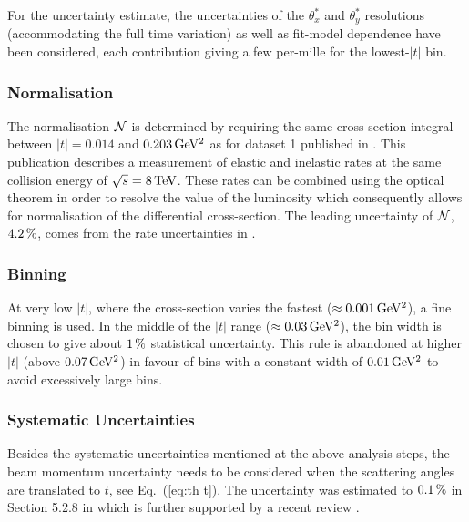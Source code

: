 For the uncertainty estimate, the uncertainties of the $\theta_x^*$ and $\theta_y^*$ resolutions (accommodating the full time variation) as well as fit-model dependence have been considered, each contribution giving a few per-mille for the lowest-$|t|$ bin.


\subsubsection{Normalisation}
\label{sec:normalisation}

The normalisation ${\cal N}$ is determined by requiring the same cross-section integral between $|t| = 0.014$ and $0.203\,{\rm GeV^2}$ as for dataset 1 published in \cite{prl111}. This publication describes a measurement of elastic and inelastic rates at the same collision energy of $\sqrt s = 8\,{\rm TeV}$. These rates can be combined using the optical theorem in order to resolve the value of the luminosity which consequently allows for normalisation of the differential cross-section. The leading uncertainty of ${\cal N}$, $4.2\,{\rm \%}$, comes from the rate uncertainties in \cite{prl111}.



\subsubsection{Binning}
\label{sec:binning}

At very low $|t|$, where the cross-section varies the fastest ($\approx 0.001\,{\rm GeV^2}$), a fine binning is used. In the middle of the $|t|$ range ($\approx 0.03\,{\rm GeV^2}$), the bin width is chosen to give about $1\,{\rm \%}$ statistical uncertainty. This rule is abandoned at higher $|t|$ (above $0.07\,{\rm GeV^2}$) in favour of bins with a constant width of $0.01\,{\rm GeV^2}$ to avoid excessively large bins.



\subsubsection{Systematic Uncertainties}
\label{sec:systematics}

Besides the systematic uncertainties mentioned at the above analysis steps, the beam momentum uncertainty needs to be considered when the scattering angles are translated to $t$, see Eq.~(\ref{eq:th t}). The uncertainty was estimated to $0.1\,{\rm \%}$ in Section 5.2.8 in \cite{8tev-90m} which is further supported by a recent review \cite{todesco-lpc}.

